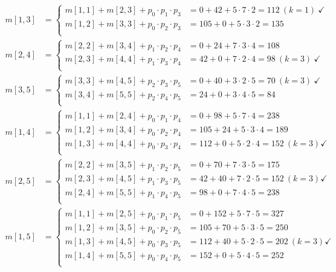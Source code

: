 \documentclass[a4paper]{article}
\begin{document}
\begin{align*}
  m[1,3] & =\left\{\begin{array}{cl}
      m[1,1] + m[2,3] + p_0\cdot p_1 \cdot p_3 &= 0 + 42 + 5 \cdot 7 \cdot 2 = 112\ (k = 1)\ \checkmark\\
      m[1,2] + m[3,3] + p_0\cdot p_2 \cdot p_3 &= 105 + 0 + 5 \cdot 3 \cdot 2 = 135 \\
  \end{array}\right. \\
  m[2,4] & =\left\{\begin{array}{cl}
      m[2,2] + m[3,4] + p_1\cdot p_2 \cdot p_4 &= 0 + 24 + 7 \cdot 3 \cdot 4 = 108\ \\
      m[2,3] + m[4,4] + p_1\cdot p_3 \cdot p_4 &= 42 + 0 + 7 \cdot 2 \cdot 4 = 98\ (k = 3)\ \checkmark\\
  \end{array}\right. \\
  m[3,5] & =\left\{\begin{array}{cl}
      m[3,3] + m[4,5] + p_2\cdot p_3 \cdot p_5 &= 0 + 40 + 3 \cdot 2 \cdot 5 = 70\ (k = 3)\ \checkmark\\
      m[3,4] + m[5,5] + p_2\cdot p_4 \cdot p_5 &= 24 + 0 + 3 \cdot 4 \cdot 5 = 84\\
  \end{array}\right. \\
  m[1,4] & =\left\{\begin{array}{cl}
      m[1,1] + m[2,4] + p_0\cdot p_1 \cdot p_4 &= 0 + 98 + 5 \cdot 7 \cdot 4 = 238 \\
      m[1,2] + m[3,4] + p_0\cdot p_2 \cdot p_4 &= 105 + 24 + 5 \cdot 3 \cdot 4 = 189\\
      m[1,3] + m[4,4] + p_0\cdot p_3 \cdot p_4 &= 112 + 0 + 5 \cdot 2 \cdot 4 = 152\ (k= 3)\checkmark\\
  \end{array}\right. \\
  m[2,5] & =\left\{\begin{array}{cl}
      m[2,2] + m[3,5] + p_1\cdot p_2 \cdot p_5 &= 0 + 70 + 7 \cdot 3 \cdot 5 = 175 \\
      m[2,3] + m[4,5] + p_1\cdot p_3 \cdot p_5 &= 42 + 40 + 7 \cdot 2 \cdot 5 = 152\ (k = 3)\checkmark\\
      m[2,4] + m[5,5] + p_1\cdot p_4 \cdot p_5 &= 98 + 0 + 7 \cdot 4 \cdot 5 = 238\\
  \end{array}\right. \\
  m[1,5] & =\left\{\begin{array}{cl}
      m[1,1] + m[2,5] + p_0\cdot p_1 \cdot p_5 &= 0 + 152 + 5\cdot 7 \cdot 5 = 327\\
      m[1,2] + m[3,5] + p_0\cdot p_2 \cdot p_5 &= 105 + 70 +5\cdot 3 \cdot 5 = 250\\
      m[1,3] + m[4,5] + p_0\cdot p_3 \cdot p_5 &= 112 + 40 +5\cdot 2 \cdot 5 = 202\ (k =3)\checkmark\\
      m[1,4] + m[5,5] + p_0\cdot p_4 \cdot p_5 &= 152 + 0 + 5\cdot 4 \cdot 5 = 252\\
  \end{array}\right. \\
\end{align*}
\end{document}
